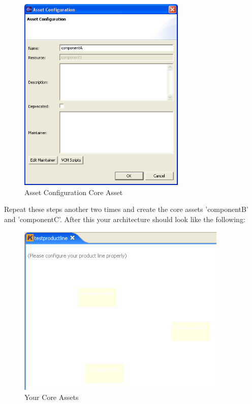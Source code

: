 \begin{figure}[h!]
\begin{center}
\includegraphics[width=8cm]{tutorial7.png}
   \caption{Asset Configuration Core Asset}
\end{center}
\end{figure}\par

Repeat these steps another two times and create the core assets 'componentB' and
'componentC'. After this your architecture should look like the following:

\begin{figure}[h!]
\begin{center}
\includegraphics[width=10cm]{tutorial8.png}
   \caption{Your Core Assets}
\end{center}
\end{figure}\par


